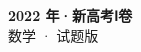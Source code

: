 \documentclass[zihao=-4, a4paper]{ctexart}
\begin{document}
\begin{center}
  {\Large\bfseries 2022 年·新高考Ⅰ卷}\\[4pt]
  {\large 数学 · 试题版}
\end{center}
\medskip
{}

\end{document}

